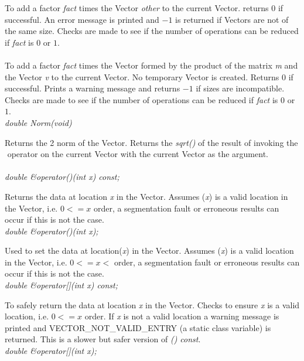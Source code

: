 To add a factor {\em fact} times the Vector {\em other} to the current
Vector. returns $0$ if successful. An error message is printed and
$-1$ is returned if Vectors are not of the same size. Checks are made
to see if the number of operations can be reduced if {\em fact} is $0$
or $1$. \\ 

 \\ 
To add a factor {\em fact} times the Vector formed by the product of
the matrix {\em m} and the Vector {\em v} to the current Vector. No
temporary Vector is created. Returns $0$ if successful. Prints a
warning message and returns $-1$ if sizes are incompatible. Checks are
made to see if the number of operations can be reduced if {\em fact}
is $0$ or $1$. \\ 


{\em double Norm(void)} 

Returns the 2 norm of the Vector. Returns the {\em sqrt()} of the
result of invoking the $\hat{ }$ operator on the current Vector with
the current Vector as the argument. \\ 

  \\
{\em double \&operator()(int x) const;} 

Returns the data at location {\em x} in the Vector. Assumes ({\em x}) 
is a valid location in the Vector, i.e. $0 <= x $ order, a
segmentation fault or erroneous results can occur if this is not the 
case. \\ 

{\em double \&operator()(int x);} 

Used to set the data at location({\em x}) in the Vector. Assumes ({\em x})
is a valid location in the Vector, i.e. $0 <= x < $ order, a
segmentation fault or erroneous results can occur if this is not the
case. \\ 

{\em double \&operator[](int x) const;} 

To safely return the data at location {\em x} in the Vector. Checks to
ensure {\em x} is a valid location, i.e. $0 <= x $ order. If {\em x}
is not a valid location a warning message is printed and
VECTOR\_NOT\_VALID\_ENTRY (a static class variable) is returned. This
is a slower but safer version of {\em () const}.\\ 

{\em double \&operator[](int x);} 

